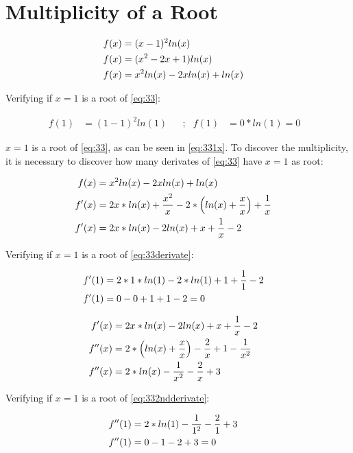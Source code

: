 \section{Multiplicity of a Root}

	\begin{align}
		f(x) &= (x-1)^{2}ln(x)& \notag \\
		f(x) &= (x^{2} - 2x + 1)ln(x)& \notag \\
		f(x) &= x^{2}ln(x) - 2xln(x) + ln(x)&
	\label{eq:33}
	\end{align}

	Verifying if $x=1$ is a root of \cref{eq:33}:

	\begin{align}
		f(1) &= (1-1)^{2}ln(1)& &;&
		f(1) &= 0*ln(1) = 0&
	\label{eq:331x}
	\end{align}

	$x=1$ is a root of \cref{eq:33}, as can be seen in \cref{eq:331x}. To discover the multiplicity, it is necessary to discover how many derivates of \cref{eq:33} have $x=1$ as root:

	\begin{align}
		f(x) &= x^{2}ln(x) - 2xln(x) + ln(x)& \notag \\
		f'(x) &= 2x*ln(x) + \frac{x^{2}}{x} -2 * \left( ln(x) + \frac{x}{x} \right) + \frac{1}{x}& \notag \\
		f'(x) &= 2x*ln(x) - 2ln(x) + x  + \frac{1}{x} - 2&
	\label{eq:33derivate}
	\end{align}

	Verifying if $x=1$ is a root of \cref{eq:33derivate}:

	\begin{align}
		f'(1) &= 2*1*ln(1) - 2*ln(1) + 1 + \frac{1}{1} - 2& \notag \\
		f'(1) &= 0 - 0 + 1 + 1 - 2 = 0&
	\label{eq:33derivate1x}
	\end{align}

	\begin{align}
		f'(x) &= 2x*ln(x) - 2ln(x) + x  + \frac{1}{x} - 2& \notag \\
		f''(x) &= 2*\left(ln(x) + \frac{x}{x}\right) - \frac{2}{x} + 1  - \frac{1}{x^2}& \notag \\
		f''(x) &= 2*ln(x) - \frac{1}{x^2} - \frac{2}{x} + 3&
	\label{eq:332ndderivate}
	\end{align}

	Verifying if $x=1$ is a root of \cref{eq:332ndderivate}:

	\begin{align}
		f''(1) &= 2*ln(1) - \frac{1}{1^2} - \frac{2}{1} + 3& \notag \\
		f''(1) &= 0 - 1 - 2 + 3 = 0& \notag \\
	\label{eq:332ndderivate1x}
	\end{align}


